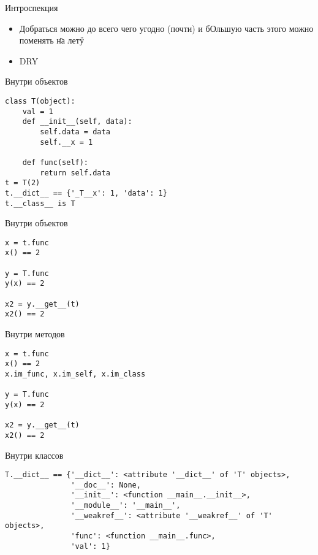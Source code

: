 \documentclass{article}
\begin{document}
\LARGE

\begin{center} Интроспекция \end{center}
\begin{itemize}
    \item Добраться можно до всего чего угодно (почти) и бОльшую часть этого можно поменять \"на лету\"
    \item DRY
\end{itemize}
\newpage

\begin{center} Внутри объектов \end{center}
\begin{lstlisting}
class T(object):
    val = 1
    def __init__(self, data):
        self.data = data
        self.__x = 1

    def func(self):
        return self.data
t = T(2)
t.__dict__ == {'_T__x': 1, 'data': 1}
t.__class__ is T
\end{lstlisting}
\newpage

\begin{center} Внутри объектов \end{center}
\begin{lstlisting}
x = t.func
x() == 2

y = T.func
y(x) == 2

x2 = y.__get__(t)
x2() == 2
\end{lstlisting}
\newpage

\begin{center} Внутри методов \end{center}
\begin{lstlisting}
x = t.func
x() == 2
x.im_func, x.im_self, x.im_class

y = T.func
y(x) == 2

x2 = y.__get__(t)
x2() == 2
\end{lstlisting}
\newpage

\begin{center} Внутри классов \end{center}
\begin{lstlisting}
T.__dict__ == {'__dict__': <attribute '__dict__' of 'T' objects>,
               '__doc__': None,
               '__init__': <function __main__.__init__>,
               '__module__': '__main__',
               '__weakref__': <attribute '__weakref__' of 'T' objects>,
               'func': <function __main__.func>,
               'val': 1}
\end{lstlisting}
\newpage
\end{document}

